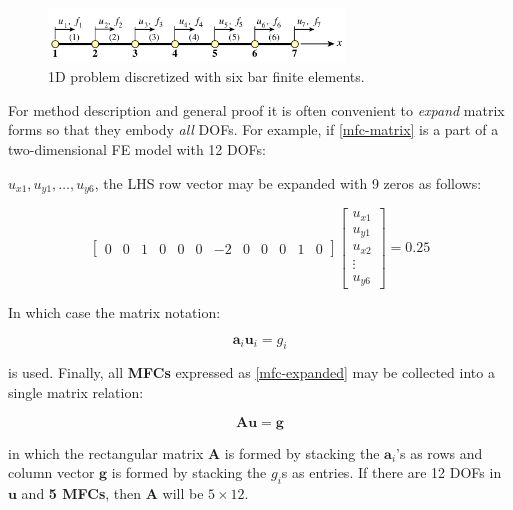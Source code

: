 \documentclass[10pt,b5paper,titlepage]{book}
\begin{document}
\begin{figure}[ht]
    \centering
    \includegraphics[width=0.70\textwidth]{img/1D_mfc_bar.png}
    \caption{1D problem discretized with six bar finite elements.}
    \label{fig:1D-MFC-bar-png}
\end{figure}

For method description and general proof it is often convenient to \textit{expand}
matrix forms so that they embody \textit{all} DOFs. For example, if
\eqref{mfc-matrix} is a part of a two-dimensional FE model with 12 DOFs:

$ u_{x1}, u_{y1}, \dots, u_{y6} $, the LHS row vector may be expanded with
9 zeros as follows:

\begin{equation}
    \begin{bmatrix}
        0 & 0 & 1 & 0 & 0 & 0 & -2 & 0 & 0 & 0 & 1 & 0
    \end{bmatrix}
    \begin{bmatrix}
        u_{x1} \\
        u_{y1} \\
        u_{x2} \\
        \vdots \\
        u_{y6}
    \end{bmatrix}
    = 0.25
\end{equation}

In which case the matrix notation:

\begin{equation}\label{mfc-expanded}
    \mathbf{a}_i \mathbf{u}_i = g_i
\end{equation}

is used. Finally, all \textbf{MFCs} expressed as \eqref{mfc-expanded} may be collected
into a single matrix relation:

\begin{equation}\label{mfc-expanded-matrix}
    \mathbf{A} \mathbf{u} = \mathbf{g}
\end{equation}

in which the rectangular matrix $ \mathbf{A} $ is formed by stacking the
$ \mathbf{a}_i $'s as rows and column vector $ \mathbf{g} $ is formed by stacking
the $ g_i $s as entries. If there are 12 DOFs in $ \mathbf{u} $ and \textbf{5 MFCs},
then $ \mathbf{A} $ will be $ 5 \times 12 $.
\end{document}
